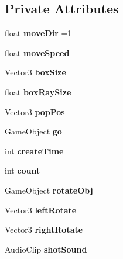 \subsection*{Private Attributes}
\begin{DoxyCompactItemize}
\item 
\mbox{\label{class_fox_a3e844417874e68b0ae737255b05beeb3}} 
float {\bfseries move\+Dir} =1
\item 
\mbox{\label{class_fox_a31bb87074fed0a4fc1690fec10b06ab7}} 
float {\bfseries move\+Speed}
\item 
\mbox{\label{class_fox_a7b0862e24555f8d7e81bdead8bef9f32}} 
Vector3 {\bfseries box\+Size}
\item 
\mbox{\label{class_fox_a15fa1e14529fd0bb173aa757cf055ba8}} 
float {\bfseries box\+Ray\+Size}
\item 
\mbox{\label{class_fox_af74795e6b3d4316eb464d8faeb4b6a77}} 
Vector3 {\bfseries pop\+Pos}
\item 
\mbox{\label{class_fox_a30350d668b27c9f751701f983a21dd7d}} 
Game\+Object {\bfseries go}
\item 
\mbox{\label{class_fox_a9e0bd50cbe1ae4b8d04ff8d539e19f3f}} 
int {\bfseries create\+Time}
\item 
\mbox{\label{class_fox_a4f1d8712583b3844eef6f03d4f88460d}} 
int {\bfseries count}
\item 
\mbox{\label{class_fox_ae3bcc1cc945ce4f879f387634bbe3c78}} 
Game\+Object {\bfseries rotate\+Obj}
\item 
\mbox{\label{class_fox_a53a206f99c8acaafffb2224c44c1cdd3}} 
Vector3 {\bfseries left\+Rotate}
\item 
\mbox{\label{class_fox_a821a8ab5b2f302f987be5ff088fc1db1}} 
Vector3 {\bfseries right\+Rotate}
\item 
\mbox{\label{class_fox_aba4b730003ea1be730b04f72f2afafa1}} 
Audio\+Clip {\bfseries shot\+Sound}
\end{DoxyCompactItemize}
